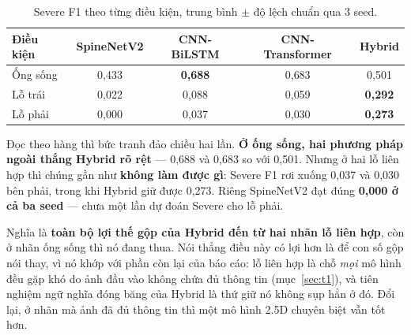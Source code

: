 \documentclass[11pt,a4paper]{article}
\newcommand{\up}[1]{\textcolor{teal!70!black}{\textbf{#1}}}
\newcommand{\down}[1]{\textcolor{red!65!black}{#1}}
\begin{document}
\begin{table}[htbp]
\centering\small
\caption{Severe F1 theo từng điều kiện, trung bình $\pm$ độ lệch chuẩn qua 3 seed.}
\label{tab:sota-severe-cond}
\begin{tabular}{lcccc}
\toprule
\textbf{Điều kiện} & \textbf{SpineNetV2} & \textbf{CNN-BiLSTM} & \textbf{CNN-Transformer} & \textbf{Hybrid} \\
\midrule
Ống sống & 0{,}433 & \textbf{0{,}688} & 0{,}683 & \down{0{,}501} \\
Lỗ trái  & 0{,}022 & 0{,}088 & 0{,}059 & \up{\textbf{0{,}292}} \\
Lỗ phải  & \down{0{,}000} & 0{,}037 & 0{,}030 & \up{\textbf{0{,}273}} \\
\bottomrule
\end{tabular}
\end{table}

Đọc theo hàng thì bức tranh đảo chiều hai lần. \textbf{Ở ống sống, hai phương pháp ngoài thắng
Hybrid rõ rệt} --- 0{,}688 và 0{,}683 so với 0{,}501. Nhưng ở hai lỗ liên hợp thì chúng gần như
\textbf{không làm được gì}: Severe F1 rơi xuống 0{,}037 và 0{,}030 bên phải, trong khi Hybrid giữ
được 0{,}273. Riêng SpineNetV2 đạt đúng \textbf{0{,}000 ở cả ba seed} --- chưa một lần dự đoán
Severe cho lỗ phải.

Nghĩa là \textbf{toàn bộ lợi thế gộp của Hybrid đến từ hai nhãn lỗ liên hợp}, còn ở nhãn ống sống
thì nó đang thua. Nói thẳng điều này có lợi hơn là để con số gộp nói thay, vì nó khớp với phần còn
lại của báo cáo: lỗ liên hợp là chỗ \emph{mọi} mô hình đều gặp khó do ảnh đầu vào không chứa đủ
thông tin (mục~\ref{sec:t1}), và tiên nghiệm ngữ nghĩa đóng băng của Hybrid là thứ giữ nó không
sụp hẳn ở đó. Đổi lại, ở nhãn mà ảnh đã đủ thông tin thì một mô hình 2.5D chuyên biệt vẫn tốt hơn.
\end{document}
